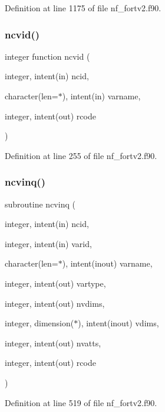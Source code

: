 Definition at line 1175 of file nf\+\_\+fortv2.\+f90.

\mbox{\label{nf__fortv2_8f90_aea3eb70885317451ef241b6feacb8893}} 
\subsubsection{\texorpdfstring{ncvid()}{ncvid()}}
{\footnotesize\ttfamily integer function ncvid (\begin{DoxyParamCaption}\item[{integer, intent(in)}]{ncid,  }\item[{character(len=$\ast$), intent(in)}]{varname,  }\item[{integer, intent(out)}]{rcode }\end{DoxyParamCaption})}



Definition at line 255 of file nf\+\_\+fortv2.\+f90.

\mbox{\label{nf__fortv2_8f90_a58c204fe024e1315e38a953ffc8bb3c9}} 
\subsubsection{\texorpdfstring{ncvinq()}{ncvinq()}}
{\footnotesize\ttfamily subroutine ncvinq (\begin{DoxyParamCaption}\item[{integer, intent(in)}]{ncid,  }\item[{integer, intent(in)}]{varid,  }\item[{character(len=$\ast$), intent(inout)}]{varname,  }\item[{integer, intent(out)}]{vartype,  }\item[{integer, intent(out)}]{nvdims,  }\item[{integer, dimension($\ast$), intent(inout)}]{vdims,  }\item[{integer, intent(out)}]{nvatts,  }\item[{integer, intent(out)}]{rcode }\end{DoxyParamCaption})}



Definition at line 519 of file nf\+\_\+fortv2.\+f90.

